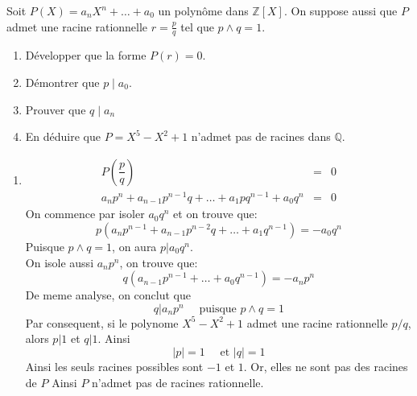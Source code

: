 \documentclass{report}
\begin{document}
\qs{}
{
  Soit $P(X)=a_nX^n+\ldots+a_0$ un polynôme dans $\mathbb{Z}[X]$. On suppose aussi
que $P$ admet une racine rationnelle $r=\frac{p}{q}$ tel que $p\wedge q
=1$.
\begin{enumerate}
  \item Développer que la forme $P(r)=0$.
  \item Démontrer que $p\;|\; a_0$.
  \item Prouver que $q\;|\; a_n$
  \item En déduire que $P=X^5 - X^2+1$ n'admet pas de racines dans
    $\mathbb{Q}$.
\end{enumerate}
}
\begin{myproof}
  \begin{enumerate}
    \item 
      \begin{eqnarray*}
        P\left(\dfrac{p}{q}\right) &=& 0\\[4pt]
        a_np^n + a_{n-1}p^{n-1}q+\ldots+a_1pq^{n-1} + a_0q^n&=& 0
      \end{eqnarray*}
      On commence par isoler $a_0q^n$ et on trouve que:
      $$
      p\left(a_n p^{n-1} + a_{n-1}p^{n-2}q + \ldots + a_1q^{n-1}\right) = -a_0q^n
      $$
      Puisque $p \wedge q = 1 $, on aura $p | a_0q^n$.\\

      On isole aussi $a_np^n$, on trouve que:
      $$
      q\left(a_{n-1}p^{n-1} + \ldots+ a_0q^{n-1}\right) = -a_np^n
      $$
      De meme analyse, on conclut que 
      $$
      q | a_np^n \quad \text { puisque } p \wedge q = 1
      $$
      Par consequent, si le polynome $X^5 - X^2 +1$ admet une racine rationnelle $p/q$, alors $p|1$ et $q|1$. Ainsi
      $$
      \vert p \vert = 1 \quad \text{ et } \vert q \vert = 1
      $$
      Ainsi les seuls racines possibles sont $-1$ et $1$. Or, elles ne sont pas des racines de $P$ 
      Ainsi $P$ n'admet pas de racines rationnelle.
  \end{enumerate}
\end{myproof}
\end{document}
